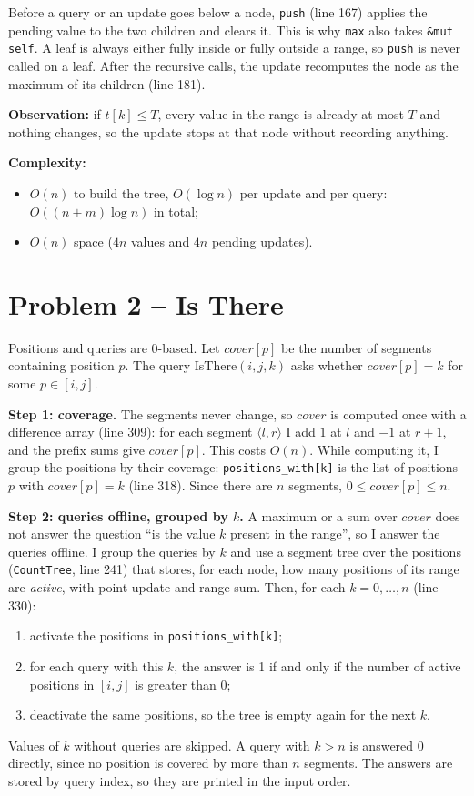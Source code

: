 \documentclass[11pt,a4paper]{article}
\begin{document}
Before a query or an update goes below a node, \texttt{push} (line 167) applies the pending value to the two
children and clears it. This is why \texttt{max} also takes \texttt{\&mut self}. A leaf is always either fully
inside or fully outside a range, so \texttt{push} is never called on a leaf. After the recursive calls, the
update recomputes the node as the maximum of its children (line 181).

\textbf{Observation:} if $t[k] \le T$, every value in the range is already at most $T$ and nothing changes,
so the update stops at that node without recording anything.

\textbf{Complexity:}
\begin{itemize}
\item $O(n)$ to build the tree, $O(\log n)$ per update and per query: $O((n+m)\log n)$ in total;
\item $O(n)$ space ($4n$ values and $4n$ pending updates).
\end{itemize}

\section*{Problem 2 -- Is There}

Positions and queries are 0-based. Let $\mathit{cover}[p]$ be the number of segments containing position $p$.
The query IsThere$(i,j,k)$ asks whether $\mathit{cover}[p] = k$ for some $p \in [i,j]$.

\textbf{Step 1: coverage.} The segments never change, so $\mathit{cover}$ is computed once with a difference
array (line 309): for each segment $\langle l, r\rangle$ I add $1$ at $l$ and $-1$ at $r+1$, and the prefix
sums give $\mathit{cover}[p]$. This costs $O(n)$. While computing it, I group the positions by their
coverage: \texttt{positions\_with[k]} is the list of positions $p$ with $\mathit{cover}[p] = k$ (line 318).
Since there are $n$ segments, $0 \le \mathit{cover}[p] \le n$.

\textbf{Step 2: queries offline, grouped by $k$.} A maximum or a sum over $\mathit{cover}$ does not answer
the question ``is the value $k$ present in the range'', so I answer the queries offline. I group the queries
by $k$ and use a segment tree over the positions (\texttt{CountTree}, line 241) that stores, for each node, how
many positions of its range are \emph{active}, with point update and range sum. Then, for each $k = 0,
\dots, n$ (line 330):
\begin{enumerate}
\item activate the positions in \texttt{positions\_with[k]};
\item for each query with this $k$, the answer is 1 if and only if the number of active positions in
$[i,j]$ is greater than 0;
\item deactivate the same positions, so the tree is empty again for the next $k$.
\end{enumerate}
Values of $k$ without queries are skipped. A query with $k > n$ is answered 0 directly, since no position is
covered by more than $n$ segments. The answers are stored by query index, so they are printed in the input
order.
\end{document}
